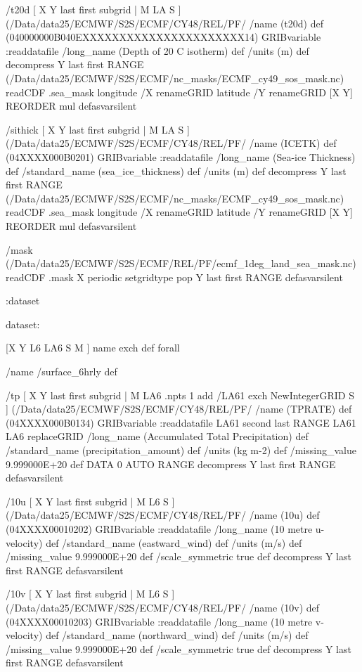 \begin{ingrid}
/t20d { [ X Y last first subgrid | M LA S ] (/Data/data25/ECMWF/S2S/ECMF/CY48/REL/PF/%
/name (t20d) def
(040000000B040EXXXXXXXXXXXXXXXXXXXXXX14) GRIBvariable
:readdatafile
/long_name (Depth of 20 C isotherm) def
/units (m) def
decompress
 Y last first RANGE
 (/Data/data25/ECMWF/S2S/ECMF/nc_masks/ECMF_cy49_sos_mask.nc) readCDF .sea_mask
   longitude /X renameGRID
   latitude /Y renameGRID
   [X Y] REORDER
mul
} defasvarsilent

/sithick { [ X Y last first subgrid | M LA S ] (/Data/data25/ECMWF/S2S/ECMF/CY48/REL/PF/%
/name (ICETK) def
(04XXXX000B0201) GRIBvariable
:readdatafile
/long_name (Sea-ice Thickness) def
/standard_name (sea_ice_thickness) def
/units (m) def
decompress
 Y last first RANGE
 (/Data/data25/ECMWF/S2S/ECMF/nc_masks/ECMF_cy49_sos_mask.nc) readCDF .sea_mask
   longitude /X renameGRID
   latitude /Y renameGRID
   [X Y] REORDER
mul
} defasvarsilent

/mask { (/Data/data25/ECMWF/S2S/ECMF/REL/PF/ecmf_1deg_land_sea_mask.nc) readCDF .mask
X periodic setgridtype pop
Y last first RANGE
} defasvarsilent

:dataset

dataset:

[X Y L6 LA6 S M ] {name exch def } forall

/name /surface_6hrly def

/tp { [ X Y last first subgrid | M LA6 .npts 1 add /LA61 exch NewIntegerGRID S ] (/Data/data25/ECMWF/S2S/ECMF/CY48/REL/PF/%
/name (TPRATE) def
(04XXXX000B0134) GRIBvariable
:readdatafile
LA61 second last RANGE
LA61 LA6 replaceGRID
/long_name (Accumulated Total Precipitation) def
/standard_name (precipitation_amount) def
/units (kg m-2) def
/missing_value 9.999000E+20 def
DATA 0 AUTO RANGE
decompress
Y last first RANGE
} defasvarsilent

/10u { [ X Y last first subgrid | M L6 S ] (/Data/data25/ECMWF/S2S/ECMF/CY48/REL/PF/%
/name (10u) def
(04XXXX00010202) GRIBvariable
:readdatafile
/long_name (10 metre u-velocity) def
/standard_name (eastward_wind) def
/units (m/s) def
/missing_value 9.999000E+20 def
/scale_symmetric true def
decompress
Y last first RANGE
} defasvarsilent

/10v { [ X Y last first subgrid | M L6 S ] (/Data/data25/ECMWF/S2S/ECMF/CY48/REL/PF/%
/name (10v) def
(04XXXX00010203) GRIBvariable
:readdatafile
/long_name (10 metre v-velocity) def
/standard_name (northward_wind) def
/units (m/s) def
/missing_value 9.999000E+20 def
/scale_symmetric true def
decompress
Y last first RANGE
} defasvarsilent



\end{ingrid}
